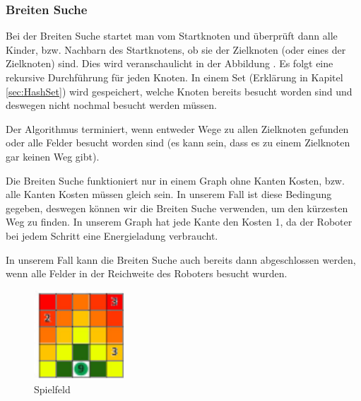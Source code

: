 \documentclass[a4paper,12pt,arial]{scrartcl}
\begin{document}
\subsubsection{Breiten Suche}


Bei der Breiten Suche startet man vom Startknoten und überprüft dann alle Kinder, bzw. Nachbarn des Startknotens, ob sie der Zielknoten (oder eines der Zielknoten) sind.
Dies wird veranschaulicht in der Abbildung .
Es folgt eine rekursive Durchführung für jeden Knoten.
In einem Set (Erklärung in Kapitel \ref{sec:HashSet}) wird gespeichert, welche Knoten bereits besucht worden sind und deswegen nicht nochmal besucht werden müssen.\cite{cormenBFS}
\par
Der Algorithmus terminiert, wenn entweder Wege zu allen Zielknoten gefunden oder alle Felder besucht worden sind (es kann sein, dass es zu einem Zielknoten gar keinen Weg gibt).

Die Breiten Suche funktioniert nur in einem Graph ohne Kanten Kosten, bzw. alle Kanten Kosten müssen gleich sein. In unserem Fall ist diese Bedingung gegeben, deswegen können wir die Breiten Suche verwenden, um den kürzesten Weg zu finden.
In unserem Graph hat jede Kante den Kosten 1, da der Roboter bei jedem Schritt eine Energieladung verbraucht.
\par
In unserem Fall kann die Breiten Suche auch bereits dann abgeschlossen werden, wenn alle Felder in der Reichweite des Roboters besucht wurden.

\begin{figure}
    \includegraphics[width=0.3\textwidth]{Stromrallye_Feld_BFS.pdf}
    \caption{Spielfeld}
    \label{fig:bfs_stromrallye}
    \vspace{-20pt}
\end{figure}
\end{document}
